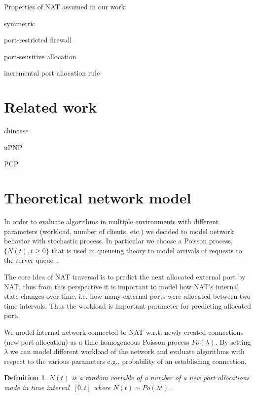 \documentclass[twoside]{article}
\newtheorem{mydef}{Definition}
\begin{document}
\begin{multicols}{2}
Properties of NAT assumed in our work:
\begin{compactitem}
\item symmetric
\item port-restricted firewall
\item port-sensitive allocation
\item incremental port allocation rule
\end{compactitem}

\section{Related work}
\begin{compactitem}
\item chineese\citep{Wang:2006:RSN:1156422.1156550}
\item uPNP
\item PCP~\citep{rfc6887}
\end{compactitem}

\section{Theoretical network model}
In order to evaluate algorithms in multiple environments with different parameters (workload, number of clients, etc.)
we decided to model network behavior with stochastic process. In particular we choose a Poisson process, $\{N(t), t\geq0\}$ 
that is used in queueing theory to model arrivals of requests to the server queue~\citep{Nelson:1995:PSP:207382}. 

The core idea of NAT traversal is to predict the next allocated external port by NAT, thus from this perspective 
it is important to model how NAT's internal state changes over time, i.e. how many external ports 
were allocated between two time intervals. Thus the workload is important parameter for predicting allocated port.

We model internal network connected to NAT w.r.t. newly created connections (new port allocation) as a 
time homogeneous Poisson process $Po(\lambda)$. By setting $\lambda$ we can model 
different workload of the network and evaluate algorithms with respect to the various parameters e.g., 
probability of an establishing connection. 


\begin{mydef}
$N(t)$ is a random variable of a number of a new port allocations made in time 
interval~$[0,t]$ where $N(t) \sim Po(\lambda t)$. \\ 
                                                      

\end{mydef}
\end{multicols}
\end{document}
